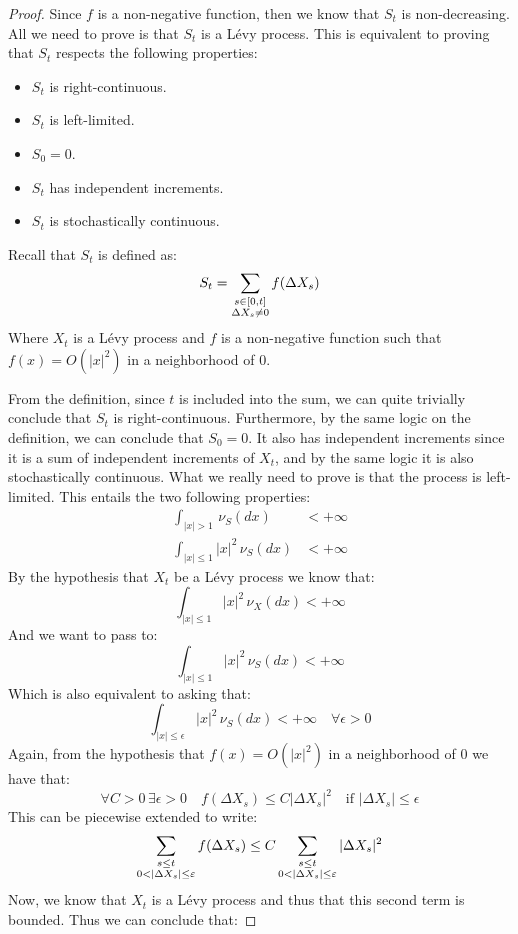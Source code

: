 \begin{proof}
Since $f$ is a non-negative function, then we know that $S_t$ is non-decreasing.
All we need to prove is that $S_t$ is a L\'evy process. This is equivalent to
proving that $S_t$ respects the following properties:
\begin{itemize}
    \item $S_t$ is right-continuous.
    \item $S_t$ is left-limited.
    \item $S_0 = 0$.
    \item $S_t$ has independent increments.
    \item $S_t$ is stochastically continuous.
\end{itemize}

Recall that $S_t$ is defined as:
\[ S_t = \sum_{\begin{subarray}{c} s\in[0,t] \\ \Delta X_s \neq 0 \end{subarray}}
    f(\Delta X_s) \]
Where $X_t$ is a L\'evy process and $f$ is a non-negative function such that
$f(x) = O(|x|^2)$ in a neighborhood of $0$. 

From the definition, since $t$ is included into the sum, we can quite trivially
conclude that $S_t$ is right-continuous. Furthermore, by the same logic on the
definition, we can conclude that $S_0 = 0$.
It also has independent increments since it is a sum of independent increments
of $X_t$, and by the same logic it is also stochastically continuous.
What we really need to prove is that the process is left-limited.
This entails the two following properties:
\begin{align*}
    \int_{|x|>1} \, \nu_S(dx) & < +\infty \\
    \int_{|x|\leq1} |x|^2 \, \nu_S(dx) & < +\infty
\end{align*}
By the hypothesis that $X_t$ be a L\'evy process we know that:
\[ \int_{|x|\leq1} |x|^2 \, \nu_X(dx) < +\infty \]
And we want to pass to:
\[ \int_{|x|\leq1} |x|^2 \, \nu_S(dx) < +\infty \]
Which is also equivalent to asking that:
\[ \int_{|x|\leq\epsilon} |x|^2 \, \nu_S(dx) < +\infty \quad \forall \epsilon >
    0 \]
Again, from the hypothesis that $f(x) = O(|x|^2)$ in a neighborhood of $0$ we
have that:
\[ \forall C>0 \, \exists \epsilon > 0 \quad f(\Delta X_s) \leq C |\Delta X_s|^2
    \quad \text{if } |\Delta X_s| \leq \epsilon \]
This can be piecewise extended to write:
\[ \sum_{\begin{subarray}{c} s\leq t \\ 0 < |\Delta X_s| \leq \epsilon
\end{subarray}} f(\Delta X_s) \leq C \sum_{\begin{subarray}{c} s\leq t \\ 0 <
|\Delta X_s| \leq \epsilon \end{subarray}} |\Delta X_s|^2 \]
Now, we know that $X_t$ is a L\'evy process and thus that this second term is
bounded. Thus we can conclude that:


\end{proof}
